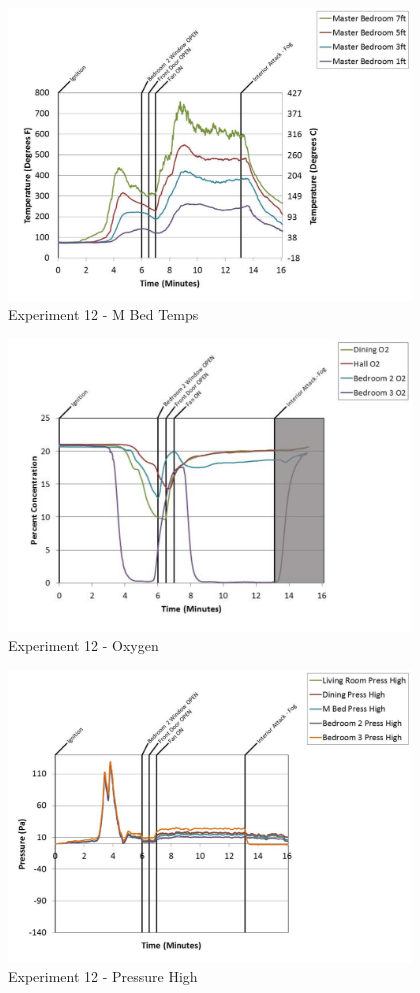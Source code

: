 \documentclass{article}
\begin{document}
\begin{appendices}
	\begin{figure}[h!]
		\centering
		\includegraphics[height=3.05in]{0_Images/Results_Charts/Exp_12_Charts/MBedTemps.pdf}
		\caption{Experiment 12 - M Bed Temps}
	\end{figure}
 
	\clearpage

	\begin{figure}[h!]
		\centering
		\includegraphics[height=3.05in]{0_Images/Results_Charts/Exp_12_Charts/Oxygen.pdf}
		\caption{Experiment 12 - Oxygen}
	\end{figure}
 

	\begin{figure}[h!]
		\centering
		\includegraphics[height=3.05in]{0_Images/Results_Charts/Exp_12_Charts/PressureHigh.pdf}
		\caption{Experiment 12 - Pressure High}
	\end{figure}
 

\end{appendices}
\end{document}
